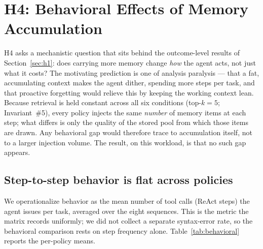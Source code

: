 

\section{H4: Behavioral Effects of Memory Accumulation}
\label{sec:h4}

H4 asks a mechanistic question that sits behind the outcome-level results of
Section~\ref{sec:h1}: does carrying more memory change \emph{how} the agent acts, not just
what it costs? The motivating prediction is one of analysis paralysis --- that a fat,
accumulating context makes the agent dither, spending more steps per task, and that
proactive forgetting would relieve this by keeping the working context lean. Because
retrieval is held constant across all six conditions (top-$k=5$; Invariant~\#5), every
policy injects the same \emph{number} of memory items at each step; what differs is only
the quality of the stored pool from which those items are drawn. Any behavioral gap would
therefore trace to accumulation itself, not to a larger injection volume. The result, on
this workload, is that no such gap appears.

\subsection{Step-to-step behavior is flat across policies}

We operationalize behavior as the mean number of tool calls (ReAct steps) the agent issues
per task, averaged over the eight sequences. This is the metric the matrix records
uniformly; we did not collect a separate syntax-error rate, so the behavioral comparison
rests on step frequency alone. Table~\ref{tab:behavioral} reports the per-policy means.


